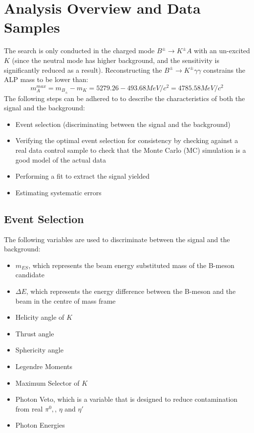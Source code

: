 \documentclass{article}
\begin{document}
\section{Analysis Overview and Data Samples}
The search is only conducted in the charged mode $B^{\pm}\rightarrow K^{\pm}A$ with an un-excited $K$ (since the neutral mode has higher background, and the sensitivity is significantly reduced as a result). Reconstructing the $B^{\pm}\rightarrow K^{\pm}\gamma\gamma$ constrains the ALP mass to be lower than: $$m_{A}^{max} = m_{B_{\pm}}-m_{K} = 5279.26-493.68 MeV/c^{2} = 4785.58 MeV/c^{2}$$
The following steps can be adhered to to describe the characteristics of both the signal and the background:
\begin{itemize}
    \item Event selection (discriminating between the signal and the background)
    \item Verifying the optimal event selection for consistency by checking against a real data control sample to check that the Monte Carlo (MC) simulation is a good model of the actual data
    \item Performing a fit to extract the signal yielded
    \item Estimating systematic errors
\end{itemize}

\subsection{Event Selection}
The following variables are used to discriminate between the signal and the background:
\begin{itemize}
    \item $m_{ES}$, which represents the beam energy substituted mass of the B-meson candidate
    \item $\Delta E$, which represents the energy difference between the B-meson and the beam in the centre of mass frame
    \item Helicity angle of $K$
    \item Thrust angle
    \item Sphericity angle
    \item Legendre Moments
    \item Maximum Selector of $K$
    \item Photon Veto, which is a variable that is designed to reduce contamination from real $\pi^{0},$, $\eta$ and $\eta'$
    \item Photon Energies
\end{itemize}
\end{document}
